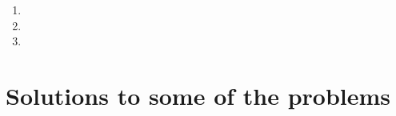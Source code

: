 \documentclass{article}
\begin{document}
\begin{enumerate}


\item


\item



\item 


\end{enumerate}

\section{Solutions to some of the problems}






\end{document}
